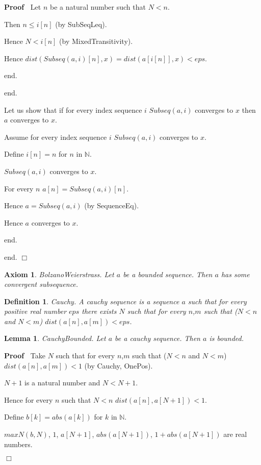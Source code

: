 \documentclass{article}
\newenvironment{forthel}{\begin{leftbar}}{\end{leftbar}}
\newenvironment{proof}{\noindent\textbf{Proof\ }}{\hspace*{\fill}$\Box$\medskip}
\newtheorem{axiom}{Axiom}
\newtheorem{lemma}{Lemma}
\newtheorem{definition}{Definition}
\newcommand{\NN}{\mathbb{N}}
\begin{document}
\begin{forthel}
\begin{proof}
				Let $n$ be a natural number such that $N < n$.
				
				Then $n \leq i[n]$ (by SubSeqLeq).
				
				Hence $N < i[n]$ (by MixedTransitivity).
				
				Hence $dist(Subseq(a,i)[n],x) = dist(a[i[n]],x) < eps$.
				
				end.
				
			end.
		
		Let us show that if for every index sequence $i$ $Subseq(a,i)$ converges to $x$ then $a$ converges to $x$.
		
		Assume for every index sequence $i$ $Subseq(a,i)$ converges to $x$.
		
		Define $i[n] = n$ for $n$ in $\NN$.
		
		$Subseq(a,i)$ converges to $x$.
		
		For every $n$ $a[n] = Subseq(a,i)[n]$.
		
		Hence $a = Subseq(a,i)$ (by SequenceEq).
		
		Hence $a$ converges to $x$.
		
		end.
		
		end.
	\end{proof}


	\begin{axiom}
		BolzanoWeierstrass.
		Let $a$ be a bounded sequence. Then $a$ has some convergent subsequence.
	\end{axiom}
	
	\begin{definition}
		Cauchy.
		A cauchy sequence is a sequence $a$ such that for every positive real number $eps$ there exists $N$ such that
		for every $n$,$m$ such that ($N < n$ and $N < m$) $dist(a[n],a[m]) < eps$.
	\end{definition}
	
	\begin{lemma}
		CauchyBounded.
		Let $a$ be a cauchy sequence. Then $a$ is bounded.
	\end{lemma}
	\begin{proof}
		Take $N$ such that for every $n$,$m$ such that ($N < n$ and $N < m$) $dist(a[n],a[m]) < 1$ (by Cauchy, OnePos).
		
		$N + 1$ is a natural number and $N < N + 1$.
		
		Hence for every $n$ such that $N < n$ $dist(a[n],a[N + 1]) < 1$.
		
		Define $b[k] = abs(a[k])$ for $k$ in $\NN$.
		
		$maxN(b,N)$, $1$, $a[N + 1]$, $abs(a[N + 1])$, $1 + abs(a[N + 1])$ are real numbers.
		

\end{proof}
\end{forthel}
\end{document}
